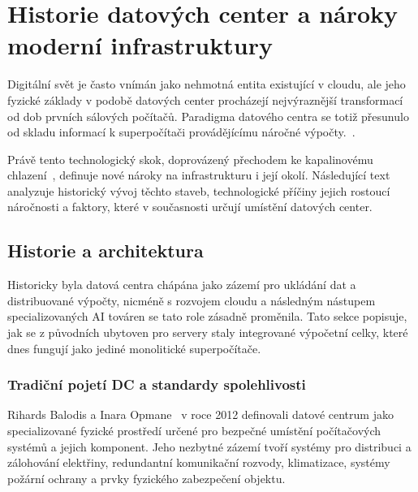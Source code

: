 \chapter{Historie datových center a nároky moderní infrastruktury}
\label{chap:historie}

Digitální svět je často vnímán jako nehmotná entita existující v cloudu, ale jeho fyzické základy v podobě datových center procházejí nejvýraznější transformací od dob prvních sálových počítačů. Paradigma datového centra se totiž přesunulo od skladu informací k superpočítači provádějícímu náročné výpočty.~\cite[s.~11]{ranganathan_twenty_2024}. 

Právě tento technologický skok, doprovázený přechodem ke kapalinovému chlazení~\cite{bizo_silicon_2022}, definuje nové nároky na infrastrukturu i její okolí. Následující text analyzuje historický vývoj těchto staveb, technologické příčiny jejich rostoucí náročnosti a faktory, které v současnosti určují umístění datových center.

\section{Historie a architektura}
\label{sec:historie}


Historicky byla datová centra chápána jako zázemí pro ukládání dat a distribuované výpočty, nicméně s rozvojem cloudu a následným nástupem specializovaných AI továren se tato role zásadně proměnila. Tato sekce popisuje, jak se z původních ubytoven pro servery staly integrované výpočetní celky, které dnes fungují jako jediné monolitické superpočítače. \cite{barroso_data_2026, ranganathan_twenty_2024, barroso_brief_2021}

\subsection{Tradiční pojetí DC a standardy spolehlivosti}
\label{subsec:tradice}

Rihards Balodis a Inara Opmane~\cite[s.~180--181]{tatnall_reflections_2012} v roce 2012 definovali datové centrum jako specializované fyzické prostředí určené pro bezpečné umístění počítačových systémů a jejich komponent. Jeho nezbytné zázemí tvoří systémy pro distribuci a zálohování elektřiny, redundantní komunikační rozvody, klimatizace, systémy požární ochrany a prvky fyzického zabezpečení objektu.

